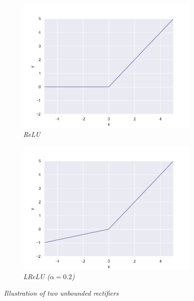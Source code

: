 \documentclass{article}
\begin{document}
            \begin{figure}[!ht]
                \begin{subfigure}{.49\linewidth}
                    \centering
                    \includegraphics[width=\linewidth]{pics/act-relu.png}
                    \caption{\textit{ReLU}}
                    \label{fig:relu}
                \end{subfigure}
                \begin{subfigure}{.49\linewidth}
                    \centering
                    \includegraphics[width=\linewidth]{pics/act-lrelu.png}
                    \caption{\textit{LReLU ($\alpha=0.2$)}}
                    \label{fig:lrelu}
                \end{subfigure}
                \caption{\textit{Illustration of two unbounded rectifiers}}
            \end{figure}
\end{document}
